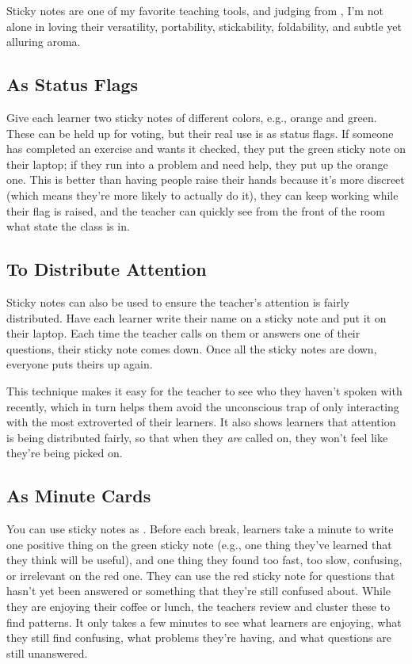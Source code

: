 
Sticky notes are one of my favorite teaching tools, and judging from
\cite{Ward2015}, I'm not alone in loving their versatility,
portability, stickability, foldability, and subtle yet alluring aroma.

\subsection*{As Status Flags}

Give each learner two sticky notes of different colors, e.g., orange and
green. These can be held up for voting, but their real use is as status
flags. If someone has completed an exercise and wants it checked, they
put the green sticky note on their laptop; if they run into a problem
and need help, they put up the orange one. This is better than having
people raise their hands because it's more discreet (which means they're
more likely to actually do it), they can keep working while their flag
is raised, and the teacher can quickly see from the front of the room
what state the class is in.

\subsection*{To Distribute Attention}

Sticky notes can also be used to ensure the teacher's attention is
fairly distributed. Have each learner write their name on a sticky note
and put it on their laptop. Each time the teacher calls on them or
answers one of their questions, their sticky note comes down. Once all
the sticky notes are down, everyone puts theirs up again.

This technique makes it easy for the teacher to see who they haven't
spoken with recently, which in turn helps them avoid the unconscious
trap of only interacting with the most extroverted of their learners. It
also shows learners that attention is being distributed fairly, so that
when they \emph{are} called on, they won't feel like they're being picked on.

\subsection*{As Minute Cards}

You can use sticky notes as .
Before each break, learners take a minute to write one positive thing on
the green sticky note (e.g., one thing they've learned that they think
will be useful), and one thing they found too fast, too slow, confusing,
or irrelevant on the red one. They can use the red sticky note for
questions that hasn't yet been answered or something that they're still
confused about. While they are enjoying their coffee or lunch, the
teachers review and cluster these to find patterns. It only takes a few
minutes to see what learners are enjoying, what they still find
confusing, what problems they're having, and what questions are still
unanswered.

